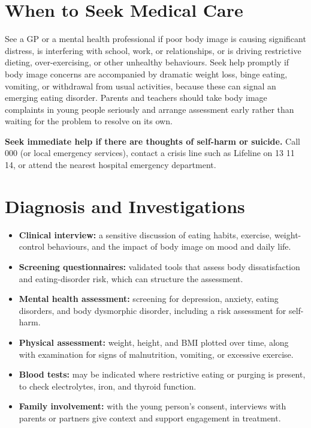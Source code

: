 \section*{When to Seek Medical Care}
See a GP or a mental health professional if poor body image is causing significant distress, is interfering with school, work, or relationships, or is driving restrictive dieting, over-exercising, or other unhealthy behaviours. Seek help promptly if body image concerns are accompanied by dramatic weight loss, binge eating, vomiting, or withdrawal from usual activities, because these can signal an emerging eating disorder. Parents and teachers should take body image complaints in young people seriously and arrange assessment early rather than waiting for the problem to resolve on its own.

\textbf{Seek immediate help if there are thoughts of self-harm or suicide.} Call 000 (or local emergency services), contact a crisis line such as Lifeline on 13 11 14, or attend the nearest hospital emergency department.

\section*{Diagnosis and Investigations}
\begin{itemize}
    \item \textbf{Clinical interview:} a sensitive discussion of eating habits, exercise, weight-control behaviours, and the impact of body image on mood and daily life.
    \item \textbf{Screening questionnaires:} validated tools that assess body dissatisfaction and eating-disorder risk, which can structure the assessment.
    \item \textbf{Mental health assessment:} screening for depression, anxiety, eating disorders, and body dysmorphic disorder, including a risk assessment for self-harm.
    \item \textbf{Physical assessment:} weight, height, and BMI plotted over time, along with examination for signs of malnutrition, vomiting, or excessive exercise.
    \item \textbf{Blood tests:} may be indicated where restrictive eating or purging is present, to check electrolytes, iron, and thyroid function.
    \item \textbf{Family involvement:} with the young person's consent, interviews with parents or partners give context and support engagement in treatment.
\end{itemize}

